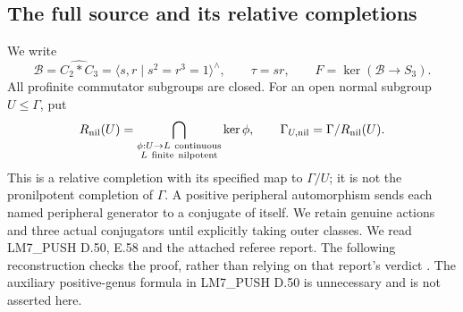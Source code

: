 \subsection{The full source and its relative completions}

We write
\[
 \mathcal B=\widehat{C_2*C_3}
   =\langle s,r\mid s^2=r^3=1\rangle^\wedge,\qquad
 \tau=sr,\qquad F=\ker(\mathcal B\to S_3).
\]
All profinite commutator subgroups are closed. For an open normal
subgroup \(U\leq\Gamma\), put
\[
 R_{\rm nil}(U)=
 \bigcap_{\substack{\phi:U\to L\ {\rm continuous}\\
                         L\ {\rm finite\ nilpotent}}}\ker\phi,
 \qquad \Gamma_{U,\rm nil}=\Gamma/R_{\rm nil}(U).
\]
This is a relative completion with its specified map to \(\Gamma/U\);
it is not the pronilpotent completion of \(\Gamma\).
A positive peripheral automorphism sends each named peripheral
generator to a conjugate of itself. We retain genuine actions and
three actual conjugators until explicitly taking outer classes.
We read LM7\_PUSH D.50, E.58 and the attached referee report.
The following reconstruction checks the proof, rather than relying
on that report's verdict \citep{cLM7Push,cLM7}. The auxiliary positive-genus formula in
LM7\_PUSH D.50 is unnecessary and is not asserted here.

